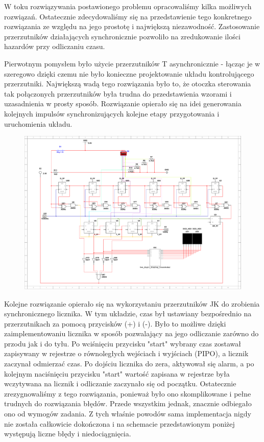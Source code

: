 \documentclass[a4paper]{article}
\begin{document}
W toku rozwiązywania postawionego problemu opracowaliśmy kilka możliwych rozwiązań. Ostatecznie
zdecydowaliśmy się na przedstawienie tego konkretnego rozwiązania ze względu na jego prostotę i 
największą niezawodność. Zastosowanie przerzutników działających synchronicznie pozwoliło na zredukowanie
ilości hazardów przy odliczaniu czasu.
\pagebreak

Pierwotnym pomysłem było użycie przerzutników T asynchronicznie - łącząc je w szeregowo dzięki czemu 
nie było konieczne projektowanie układu kontrolującego przerzutniki. Największą wadą tego rozwiązania
było to, że otoczka sterowania tak połączonych przerzutników była trudna do przedstawienia wzorami i 
uzasadnienia w prosty sposób. Rozwiązanie opierało się na idei generowania kolejnych impulsów 
synchronizujących kolejne etapy przygotowania i uruchomienia układu.

\begin{figure}[H]
    \centering
    \includegraphics[width=\textwidth]{lab2_1.pdf}
\end{figure}
\pagebreak

Kolejne rozwiązanie opierało się na wykorzystaniu przerzutników JK do zrobienia synchronicznego licznika.
W tym układzie, czas był ustawiany bezpośrednio na przerzutnikach za pomocą przycisków (+) i (-). Było to możliwe
dzięki zaimplementowaniu licznika w sposób pozwalający na jego odliczanie zarówno do przodu jak i do tyłu.
Po wciśnięciu przycisku "start" wybrany czas zostawał zapisywany w rejestrze o równoległych wejściach i wyjściach (PIPO),
a licznik zaczynał odmierzać czas. Po dojściu licznika do zera, aktywował się alarm, a po kolejnym naciśnięciu
przycisku "start" wartość zapisana w rejestrze była wczytywana na licznik i odliczanie zaczynało się od początku.
Ostatecznie zrezygnowaliśmy z tego rozwiązania, ponieważ było ono skomplikowane i pełne trudnych do rozwiązania błędów.
Przede wszystkim jednak, znacznie odbiegało ono od wymogów zadania. Z tych właśnie powodów sama implementacja nigdy
nie została całkowicie dokończona i na schemacie przedstawionym poniżej występują liczne błędy i niedociągnięcia. 
\end{document}
